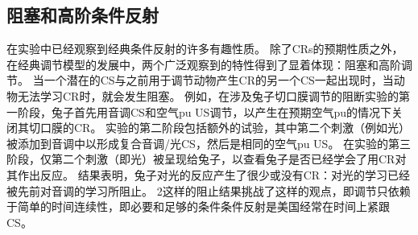 \subsection{阻塞和高阶条件反射} \label{sec:blocking_higher_order}

在实验中已经观察到经典条件反射的许多有趣性质。
除了CRs的预期性质之外，在经典调节模型的发展中，两个广泛观察到的特性得到了显着体现：阻塞和高阶调节。
当一个潜在的CS与之前用于调节动物产生CR的另一个CS一起出现时，当动物无法学习CR时，就会发生阻塞。
例如，在涉及兔子切口膜调节的阻断实验的第一阶段，兔子首先用音调CS和空气pu US调节，以产生在预期空气pu的情况下关闭其切口膜的CR。
实验的第二阶段包括额外的试验，其中第二个刺激（例如光）被添加到音调中以形成复合音调/光CS，然后是相同的空气pu US。
在实验的第三阶段，仅第二个刺激（即光）被呈现给兔子，以查看兔子是否已经学会了用CR对其作出反应。
结果表明，兔子对光的反应产生了很少或没有CR：对光的学习已经被先前对音调的学习所阻止。
2这样的阻止结果挑战了这样的观点，即调节只依赖于简单的时间连续性，即必要和足够的条件条件反射是美国经常在时间上紧跟CS。
